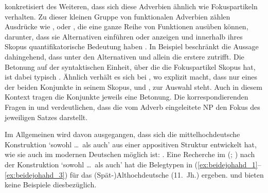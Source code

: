 \citet[425--428]{johannessen2005} konkretisiert des Weiteren, dass sich diese
Adverbien ähnlich wie Fokuspartikeln verhalten. Zu dieser kleinen
Gruppe von funktionalen Adverbien zählen Ausdrücke wie ,
 oder , die eine ganze Reihe von Funktionen ausüben können,
darunter, dass sie Alternativen einführen oder anzeigen und innerhalb ihres
Skopus quantifikatorische Bedeutung haben \autocite[vgl.][1--4,
15]{koenig1991}. In Beispiel  beschränkt  die
Aussage dahingehend, dass unter den Alternativen  und 
allein die erstere zutrifft. Die Betonung auf der syntaktischen Einheit, über
die die Fokuspartikel Skopus hat, ist dabei typisch
\autocite[10--14]{koenig1991}. Ähnlich verhält es sich bei ,
wo  explizit macht, dass nur eines der beiden Konjunkte in seinem
Skopus,  und , zur Auswahl steht. Auch in diesem Kontext
tragen die Konjunkte jeweils eine Betonung. Die korrespondierenden Fragen in
 und  verdeutlichen, dass die vom
Adverb eingeleitete NP den Fokus des jeweiligen Satzes darstellt.

\begin{exe}
\end{exe}

Im Allgemeinen wird davon ausgegangen, dass sich die
mittelhochdeutsche Konstruktion 
`sowohl \dots\ als auch' aus einer appositiven Struktur
entwickelt hat, wie sie auch im modernen Deutschen möglich
ist:  \autocite[vgl.][626--627 und die
dortigen Referenzen]{ksw2}. Eine Recherche im  (;
\nosh\cite{ddd}) nach der Konstruktion  `sowohl \dots\
als auch' \autocite[vgl.][49]{schuetzeichel2012} hat die Belegtypen in
(\ref{ex:beidejohahd_1}--\ref{ex:beidejohahd_3}) für das
(Spät-)Althochdeutsche (11.~Jh.) ergeben. \citet{braune2018}
und \citet{schrodt2004} bieten keine Beispiele dies\-bezüglich.

